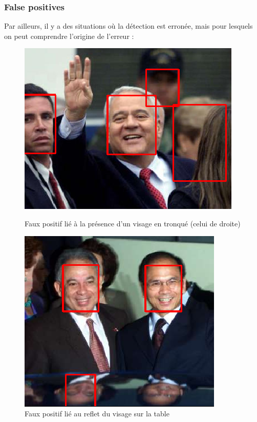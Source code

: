 \documentclass[a4paper,11pt]{article}
\begin{document}
\subsubsection{False positives}

Par ailleurs, il y a des situations où la détection est erronée, mais pour lesquels on peut comprendre l'origine de l'erreur :\\

\begin{figure}[H]
    \centering
    \begin{minipage}[c]{0.45\linewidth}
        \begin{center}
            \includegraphics[scale=0.475]{facenetFP6.png}
            \caption{Faux positif lié à la présence d'un visage en tronqué (celui de droite)}
        \end{center}
    \end{minipage} \hfill
    \begin{minipage}[c]{0.45\linewidth}
        \begin{center}
            \includegraphics[scale=0.45]{facenetFP2.png}
            \caption{Faux positif lié au reflet du visage sur la table}
        \end{center}
    \end{minipage}
\end{figure}
\end{document}
